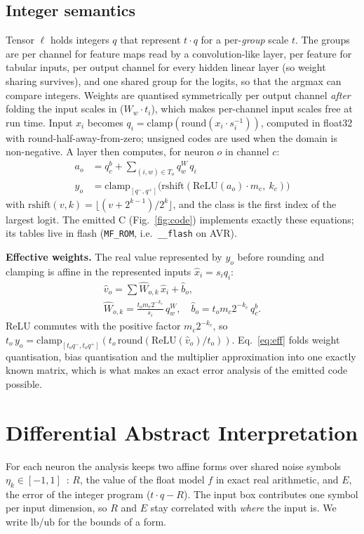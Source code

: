 \subsection{Integer semantics}
Tensor $\ell$ holds integers $q$ that represent $t\cdot q$ for a per-\emph{group} scale $t$. The groups are per channel for feature maps read by a convolution-like layer, per feature for tabular inputs, per output channel for every hidden linear layer (so weight sharing survives), and one shared group for the logits, so that the argmax can compare integers. Weights are quantised symmetrically per output channel \emph{after} folding the input scales in ($W_w\cdot t_{i}$), which makes per-channel input scales free at run time. Input $x_i$ becomes $q_i=\mathrm{clamp}(\mathrm{round}(x_i\cdot s_i^{-1}))$, computed in float32 with round-half-away-from-zero; unsigned codes are used when the domain is non-negative. A layer then computes, for neuron $o$ in channel $c$:
\begin{align}
a_o &= q^b_c+\textstyle\sum_{(i,w)\in T_o} q^W_w\,q_i\label{eq:acc}\\
y_o &= \mathrm{clamp}_{[q^-,q^+]}\bigl(\mathrm{rshift}(\mathrm{ReLU}(a_o)\cdot m_c,\ k_c)\bigr)\label{eq:req}
\end{align}
with $\mathrm{rshift}(v,k)=\lfloor (v+2^{k-1})/2^{k}\rfloor$, and the class is the first index of the largest logit. The emitted C (Fig.~\ref{fig:code}) implements exactly these equations; its tables live in flash (\texttt{MF\_ROM}, i.e.\ \texttt{\_\_flash} on AVR).

\textbf{Effective weights.} The real value represented by $y_o$ before rounding and clamping is affine in the represented inputs $\hat x_i=s_i q_i$:
\begin{equation}
\begin{gathered}
\hat v_o=\textstyle\sum \hat W_{o,k}\,\hat x_i+\hat b_o,\\
\hat W_{o,k}=\frac{t_o m_c 2^{-k_c}}{s_i}\,q^W_w,\quad \hat b_o=t_o m_c 2^{-k_c}\,q^b_c .
\end{gathered}
\label{eq:eff}
\end{equation}
ReLU commutes with the positive factor $m_c2^{-k_c}$, so $t_o\,y_o=\mathrm{clamp}_{[t_oq^-,t_oq^+]}(t_o\,\mathrm{round}(\mathrm{ReLU}(\hat v_o)/t_o))$. Eq.~\eqref{eq:eff} folds weight quantisation, bias quantisation and the multiplier approximation into one exactly known matrix, which is what makes an exact error analysis of the emitted code possible.

\section{Differential Abstract Interpretation}\label{sec:ai}
For each neuron the analysis keeps two affine forms over shared noise symbols $\eta_k\in[-1,1]$~\cite{affine}: $R$, the value of the float model $f$ in exact real arithmetic, and $E$, the error of the integer program ($t\cdot q-R$). The input box contributes one symbol per input dimension, so $R$ and $E$ stay correlated with \emph{where} the input is. We write $\mathrm{lb}$/$\mathrm{ub}$ for the bounds of a form.

